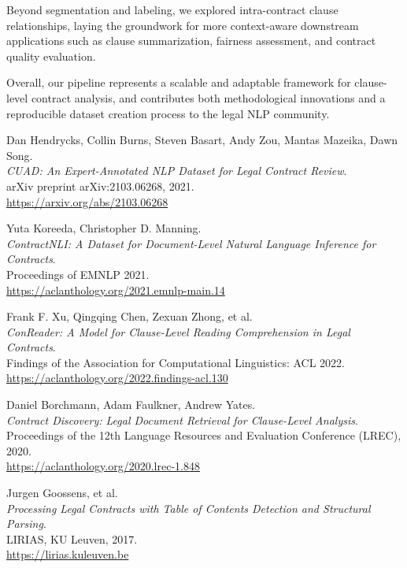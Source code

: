 \documentclass[11pt, oneside]{article}   	%
\begin{document}
Beyond segmentation and labeling, we explored intra-contract clause relationships, laying the groundwork for more context-aware downstream applications such as clause summarization, fairness assessment, and contract quality evaluation.

Overall, our pipeline represents a scalable and adaptable framework for clause-level contract analysis, and contributes both methodological innovations and a reproducible dataset creation process to the legal NLP community.
\begin{thebibliography}{9}

	Dan Hendrycks, Collin Burns, Steven Basart, Andy Zou, Mantas Mazeika, Dawn Song.\\
	\textit{CUAD: An Expert-Annotated NLP Dataset for Legal Contract Review}.\\
	arXiv preprint arXiv:2103.06268, 2021.\\
	\href{https://arxiv.org/abs/2103.06268}{https://arxiv.org/abs/2103.06268}
	
	Yuta Koreeda, Christopher D. Manning.\\
	\textit{ContractNLI: A Dataset for Document-Level Natural Language Inference for Contracts}.\\
	Proceedings of EMNLP 2021.\\
	\href{https://aclanthology.org/2021.emnlp-main.14}{https://aclanthology.org/2021.emnlp-main.14}
	
	Frank F. Xu, Qingqing Chen, Zexuan Zhong, et al.\\
	\textit{ConReader: A Model for Clause-Level Reading Comprehension in Legal Contracts}.\\
	Findings of the Association for Computational Linguistics: ACL 2022.\\
	\href{https://aclanthology.org/2022.findings-acl.130}{https://aclanthology.org/2022.findings-acl.130}
	
	Daniel Borchmann, Adam Faulkner, Andrew Yates.\\
	\textit{Contract Discovery: Legal Document Retrieval for Clause-Level Analysis}.\\
	Proceedings of the 12th Language Resources and Evaluation Conference (LREC), 2020.\\
	\href{https://aclanthology.org/2020.lrec-1.848}{https://aclanthology.org/2020.lrec-1.848}
	
	Jurgen Goossens, et al.\\
	\textit{Processing Legal Contracts with Table of Contents Detection and Structural Parsing}.\\
	LIRIAS, KU Leuven, 2017.\\
	\href{https://lirias.kuleuven.be}{https://lirias.kuleuven.be}
	

\end{thebibliography}
\end{document}

